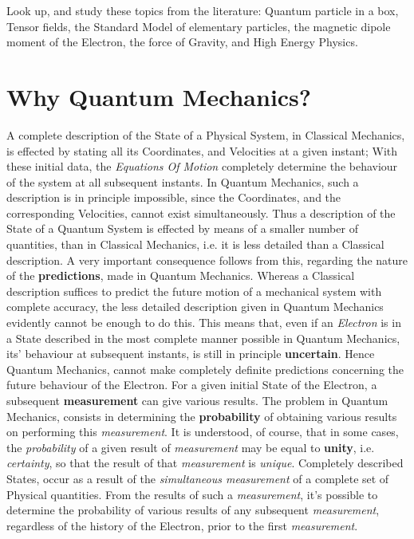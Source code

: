\documentclass[a4paper, 10pt, onepage]{elegantbook}
\begin{document}
Look up, and study these topics from the literature: Quantum particle in a box,
Tensor fields, the Standard Model of elementary particles, the magnetic dipole moment of the Electron, the force of 
Gravity, and High Energy Physics.

\newpage

\section{Why Quantum Mechanics?}

A complete description of the State of a Physical System, in Classical Mechanics,
is effected by stating all its Coordinates, and Velocities at a given instant;
With these initial data, the \emph{Equations Of Motion} completely determine the behaviour of the system at all 
subsequent instants.
In Quantum Mechanics, such a description is in principle impossible, since the Coordinates,
and the corresponding Velocities, cannot exist simultaneously.
Thus a description of the State of a Quantum System is effected by means of a smaller number of quantities,
than in Classical Mechanics, i.e. it is less detailed than a Classical description.  
A very important consequence follows from this, regarding the nature of the \textbf{predictions},
made in Quantum Mechanics. Whereas a Classical description suffices to predict the future motion of a mechanical system 
with complete accuracy,
the less detailed description given in Quantum Mechanics evidently cannot be enough to do this.
This means that, even if an \emph{Electron} is in a State described in the most complete manner possible in Quantum 
Mechanics,
its' behaviour at subsequent instants, is still in principle \textbf{uncertain}. Hence Quantum Mechanics,
cannot make completely definite predictions concerning the future behaviour of the Electron. For a given initial State 
of the Electron, a subsequent \textbf{measurement} can give various results. The problem in Quantum Mechanics,
consists in determining the \textbf{probability} of obtaining various results on performing this \emph{measurement}. It 
is understood, of course, that in some cases, the \emph{probability} of a given result of \emph{measurement} may be 
equal to  \textbf{unity}, i.e. \emph{certainty}, so that the result of that \emph{measurement} is \emph{unique}.
Completely described States, occur as a result of the \emph{simultaneous measurement} of a complete set of Physical 
quantities.
From the results of such a \emph{measurement}, it's possible to determine the probability of various results of any 
subsequent \emph{measurement},
regardless of the history of the Electron, prior to the first \emph{measurement}.
\end{document}
